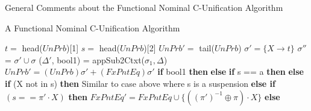 \begin{frame}{General Comments about the Functional Nominal C-Unification Algorithm}

\end{frame}

\begin{frame}[allowframebreaks]{A Functional Nominal C-Unification Algorithm}
\begin{algorithmic}[1]
        \State {} 
    \Else 
    \State $t =$ head($UnPrb$)[1]
    \State $s =$ head($UnPrb$)[2]
    \State $UnPrb' =$ tail($UnPrb$)
            \State $\sigma' = \{X \rightarrow t \}$
            \State $\sigma''$ = $\sigma' \cup \sigma$ 
            \State ($\Delta'$, bool1) = appSub2Ctxt($\sigma_1, \Delta$) 
            \State $UnPrb' = (UnPrb)\sigma' +   (FxPntEq)\sigma'$
            \Statex
            \State \textbf{if} bool1 \textbf{then}  
            \State \textbf{else} 
        \Else 
                \State \textbf{if} s == a \textbf{then} 
                \State \hspace{8 \algorithmicxindent} 
                \State \textbf{else} 
                \State \textbf{if} (X not in s) \textbf{then}
                \State \hspace{8 \algorithmicxindent}
                \Comment Similar to case above where s is a suspension
                \Statex \Statex
                \State \textbf{else if} $(s == \pi' \cdot X)$ \textbf{then}
                \State \hspace{8 \algorithmicxindent}
                $FxPntEq' = FxPntEq \cup \{((\pi')^{-1} \oplus \pi) \cdot X\}$
                \State \hspace{8 \algorithmicxindent}
                \State \textbf{else} 


\end{algorithmic}
\end{frame}
